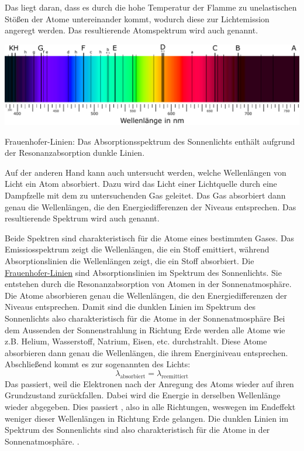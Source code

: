 \documentclass{tuftebook}
\begin{document}
        Das liegt daran, dass es durch die hohe Temperatur der Flamme zu unelastischen Stößen der Atome untereinander kommt, wodurch diese zur Lichtemission angeregt werden. Das resultierende Atomspektrum wird auch  genannt.
        \begin{marginfigure}
            \centering
            \includegraphics[width=\linewidth]{figures/frauenhoferlinien.pdf}
            \caption{Frauenhofer-Linien: Das Absorptionsspektrum des Sonnenlichts enthält aufgrund der Resonanzabsorption dunkle Linien.}
            \label{fig:frauenhoferlinien}
        \end{marginfigure}
        Auf der anderen Hand kann auch untersucht werden, welche Wellenlängen von Licht ein Atom absorbiert. Dazu wird das Licht einer Lichtquelle durch eine Dampfzelle mit dem zu untersuchenden Gas geleitet. Das Gas absorbiert dann genau die Wellenlängen, die den Energiedifferenzen der Niveaus entsprechen. Das resultierende Spektrum wird auch  genannt.

        Beide Spektren sind charakteristisch für die Atome eines bestimmten Gases. Das Emissiosspektrum zeigt die Wellenlängen, die ein Stoff emittiert, während Absorptionslinien die Wellenlängen zeigt, die ein Stoff absorbiert. Die \hyperref[fig:frauenhoferlinien]{Frauenhofer-Linien} sind Absorptionslinien im Spektrum des Sonnenlichts. Sie entstehen durch die Resonanzabsorption von Atomen in der Sonnenatmosphäre. Die Atome absorbieren genau die Wellenlängen, die den Energiedifferenzen der Niveaus entsprechen. Damit sind die dunklen Linien im Spektrum des Sonnenlichts also charakteristisch für die Atome in der Sonnenatmosphäre\sidenote
        {
        Bei dem Aussenden der Sonnenstrahlung in Richtung Erde werden alle Atome wie z.B. Helium, Wasserstoff, Natrium, Eisen, etc. durchstrahlt. Diese Atome absorbieren dann genau die Wellenlängen, die ihrem Energiniveau entsprechen. Abschließend kommt es zur sogenannten  des Lichts:
        \[\lambda_{\mathrm{absorbiert}}=\lambda_{\mathrm{reemittiert}}\]
        Das passiert, weil die Elektronen nach der Anregung des Atoms wieder auf ihren Grundzustand zurückfallen. Dabei wird die Energie in derselben Wellenlänge wieder abgegeben. Dies passiert , also in alle Richtungen, weswegen im Endeffekt weniger dieser Wellenlängen in Richtung Erde gelangen. Die dunklen Linien im Spektrum des Sonnenlichts sind also charakteristisch für die Atome in der Sonnenatmosphäre.
        }.
        
\end{document}
